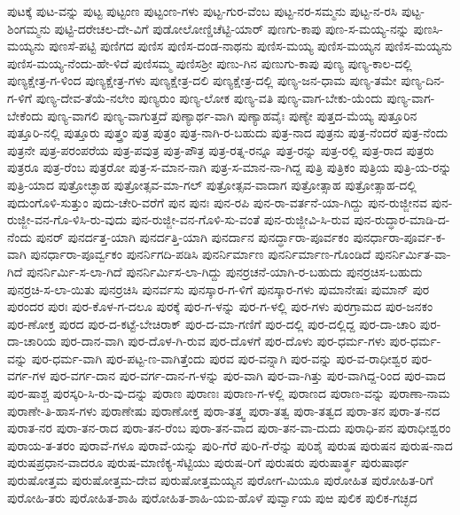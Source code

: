 ಪುಟಕ್ಕೆ
ಪುಟ-ವನ್ನು
ಪುಟ್ಟ
ಪುಟ್ಟಂಣ
ಪುಟ್ಟಂಣ-ಗಳು
ಪುಟ್ಟ-ಗುರ-ವೆಂಬ
ಪುಟ್ಟ-ನರ-ಸಮ್ಮನು
ಪುಟ್ಟ-ನ-ರಸಿ
ಪುಟ್ಟ-ಶಿಂಗಮ್ಮನು
ಪುಟ್ಟಿ-ದರೇಚಲ-ದೇ-ವಿಗೆ
ಪುಡೋಲೋಣ್ಡಿಚೆಟ್ಟಿ-ಯಾರ್
ಪುಣಗು-ಕಾಪು
ಪುಣ-ಸ-ಮಯ್ಯ-ನನ್ನು
ಪುಣಸಿ-ಮಯ್ಯನು
ಪುಣಸೆ-ಪಟ್ಟಿ
ಪುಣಿಗದ
ಪುಣಿಸ
ಪುಣಿಸ-ದಂಡ-ನಾಥನು
ಪುಣಿಸ-ಮಯ್ಯ
ಪುಣಿಸ-ಮಯ್ಯನ
ಪುಣಿಸ-ಮಯ್ಯನು
ಪುಣಿಸ-ಮಯ್ಯ-ನೆಂದು-ಹೇ-ಳಿದೆ
ಪುಣಿಸಮ್ಮ
ಪುಣಿಸಶ್ರೀ
ಪುಣು-ಗಿನ
ಪುಣುಗು-ಕಾಪು
ಪುಣ್ಯ
ಪುಣ್ಯ-ಕಾಲ-ದಲ್ಲಿ
ಪುಣ್ಯಕ್ಷೇತ್ರ-ಗ-ಳಿಂದ
ಪುಣ್ಯಕ್ಷೇತ್ರ-ಗಳು
ಪುಣ್ಯಕ್ಷೇತ್ರ-ದಲಿ
ಪುಣ್ಯಕ್ಷೇತ್ರ-ದಲ್ಲಿ
ಪುಣ್ಯ-ಜನ-ಧಾಮ
ಪುಣ್ಯ-ತಮೇ
ಪುಣ್ಯ-ದಿನ-ಗ-ಳಿಗೆ
ಪುಣ್ಯ-ದೇವ-ತೆಯೆ-ನಲೇಂ
ಪುಣ್ಯರುಂ
ಪುಣ್ಯ-ಲೋಕ
ಪುಣ್ಯ-ವತಿ
ಪುಣ್ಯ-ವಾಗ-ಬೇಕು-ಯೆಂದು
ಪುಣ್ಯ-ವಾಗ-ಬೇಕೆಂದು
ಪುಣ್ಯ-ವಾಗಲಿ
ಪುಣ್ಯ-ವಾಗುತ್ತದೆ
ಪುಣ್ಯಾರ್ಥ-ವಾಗಿ
ಪುಣ್ಯಾಹವೈಃ
ಪುಣ್ಯೇ
ಪುತ್ತದ-ಮೆಯ್ಯ
ಪುತ್ತೂರಿನ
ಪುತ್ತೂರಿ-ನಲ್ಲಿ
ಪುತ್ತೂರು
ಪುತ್ತ್ರಂ
ಪುತ್ರ
ಪುತ್ರಂ
ಪುತ್ರ-ನಾಗಿ-ರ-ಬಹುದು
ಪುತ್ರ-ನಾದ
ಪುತ್ರನು
ಪುತ್ರ-ನೆಂದರೆ
ಪುತ್ರ-ನೆಂದು
ಪುತ್ರನೇ
ಪುತ್ರ-ಪರಂಪರೆಯ
ಪುತ್ರ-ಪವುತ್ರ
ಪುತ್ರ-ಪೌತ್ರ
ಪುತ್ರ-ರತ್ನ-ರನ್ನೂ
ಪುತ್ರ-ರನ್ನು
ಪುತ್ರ-ರಲ್ಲಿ
ಪುತ್ರ-ರಾದ
ಪುತ್ರರು
ಪುತ್ರರೂ
ಪುತ್ರ-ರೆಂಬ
ಪುತ್ರರೋ
ಪುತ್ರ-ಸ-ಮಾನ-ನಾಗಿ
ಪುತ್ರ-ಸ-ಮಾನ-ನಾ-ಗಿದ್ದ
ಪುತ್ರಿ
ಪುತ್ರಿಕಂ
ಪುತ್ರಿಯ
ಪುತ್ರಿ-ಯ-ರನ್ನು
ಪುತ್ರಿ-ಯಾದ
ಪುತ್ರೋಚ್ಛಾಹ
ಪುತ್ರೋತ್ಸವ-ಮಾ-ಗಲ್
ಪುತ್ರೋತ್ಸವ-ವಾದಾಗ
ಪುತ್ರೋತ್ಸಾಹ
ಪುತ್ರೋತ್ಸಾಹ-ದಲ್ಲಿ
ಪುದುಂಗೊಳಿ-ಸುತ್ತುಂ
ಪುದು-ಚೇರಿ-ವರೆಗೆ
ಪುನ
ಪುನಃ
ಪುನ-ರಪಿ
ಪುನ-ರಾ-ವರ್ತನೆ-ಯಾ-ಗಿದ್ದು
ಪುನ-ರುಜ್ಜೀನವ
ಪುನ-ರುಜ್ಜೀ-ವನ-ಗೊ-ಳಿಸಿ-ರು-ವುದು
ಪುನ-ರುಜ್ಜೀ-ವನ-ಗೊಳಿ-ಸು-ವಂತೆ
ಪುನ-ರುಜ್ಜೀವಿ-ಸಿ-ರುವ
ಪುನ-ರುದ್ಧಾರ-ಮಾಡಿ-ದ-ನೆಂದು
ಪುನರ್
ಪುನರ್ದತ್ತ-ಯಾಗಿ
ಪುನರ್ದತ್ತಿ-ಯಾಗಿ
ಪುನರ್ದಾನ
ಪುನರ್ದ್ಧಾರಾ-ಪೂರ್ವಕಂ
ಪುನರ್ಧಾರಾ-ಪೂರ್ವ-ಕ-ವಾಗಿ
ಪುನರ್ಧಾರಾ-ಪೂರ್ವ್ವಕಂ
ಪುನರ್ನಿಗದಿ-ಪಡಿಸಿ
ಪುನರ್ನಿರ್ಮಾಣ
ಪುನರ್ನಿರ್ಮಾಣ-ಗೊಂಡಿದೆ
ಪುನರ್ನಿರ್ಮಿತ-ವಾ-ಗಿದೆ
ಪುನರ್ನಿರ್ಮಿ-ಸ-ಲಾ-ಗಿದೆ
ಪುನರ್ನಿರ್ಮಿಸ-ಲಾ-ಗಿದ್ದು
ಪುನರ್ರಚನೆ-ಯಾಗಿ-ರ-ಬಹುದು
ಪುನರ್ರಚಿಸ-ಬಹುದು
ಪುನರ್ರಚಿ-ಸ-ಲಾ-ಯಿತು
ಪುನರ್ರಚಿಸಿ
ಪುನರ್ವಸು
ಪುನಸ್ಕಾರ-ಗ-ಳಿಗೆ
ಪುನಸ್ಕಾರ-ಗಳು
ಪುಮಾನೇಷಃ
ಪುಮಾನ್
ಪುರ
ಪುರಂದರ
ಪುರಃ
ಪುರ-ಕೊಳ-ಗ-ದಲೂ
ಪುರಕ್ಕೆ
ಪುರ-ಗ-ಳನ್ನು
ಪುರ-ಗ-ಳಲ್ಲಿ
ಪುರ-ಗಳು
ಪುರಗ್ರಾಮದ
ಪುರ-ಜನಕಂ
ಪುರ-ಣೋಕ್ತ
ಪುರದ
ಪುರ-ದ-ಕಟ್ಟೆ-ಬೇಚಿರಾಕ್
ಪುರ-ದ-ಮಾ-ಗಣಿಗೆ
ಪುರ-ದಲ್ಲಿ
ಪುರ-ದಲ್ಲಿದ್ದ
ಪುರ-ದಾ-ಚಾರಿ
ಪುರ-ದಾ-ಚಾರಿಯ
ಪುರ-ದಾನ-ವಾಗಿ
ಪುರ-ದೊಳ-ಗಿ-ರುವ
ಪುರ-ದೊಳಗೆ
ಪುರ-ದೊಳು
ಪುರ-ಧರ್ಮ-ಗಳು
ಪುರ-ಧರ್ಮ-ವನ್ನು
ಪುರ-ಧರ್ಮ-ವಾಗಿ
ಪುರ-ಪಟ್ಟ-ಣ-ವಾಗಿತ್ತೆಂದು
ಪುರವ
ಪುರ-ವನ್ನಾಗಿ
ಪುರ-ವನ್ನು
ಪುರ-ವ-ರಾಧೀಶ್ವರ
ಪುರ-ವರ್ಗ-ಗಳ
ಪುರ-ವರ್ಗ-ದಾನ
ಪುರ-ವರ್ಗ-ದಾನ-ಗ-ಳನ್ನು
ಪುರ-ವಾಗಿ
ಪುರ-ವಾ-ಗಿತ್ತು
ಪುರ-ವಾಗಿದ್ದ-ರಿಂದ
ಪುರ-ವಾದ
ಪುರ-ಷಾಶ್ಚ
ಪುರಸ್ಕರಿ-ಸಿ-ರು-ವು-ದನ್ನು
ಪುರಾಣ
ಪುರಾಣಃ
ಪುರಾಣ-ಗ-ಳಲ್ಲಿ
ಪುರಾಣದ
ಪುರಾಣ-ವನ್ನು
ಪುರಾಣಾ-ನಾಮ
ಪುರಾಣೇ-ತಿ-ಹಾಸ-ಗಳು
ಪುರಾಣೇಷು
ಪುರಾಣೋಕ್ತ
ಪುರಾ-ತತ್ತ್ವ
ಪುರಾ-ತತ್ವ
ಪುರಾ-ತತ್ವದ
ಪುರಾ-ತನ
ಪುರಾ-ತ-ನದ
ಪುರಾತ-ನರ
ಪುರಾ-ತನ-ರಾದ
ಪುರಾ-ತನ-ರೆಂಬ
ಪುರಾ-ತನ-ವಾದ
ಪುರಾ-ತನ-ವಾ-ದುದು
ಪುರಾಧಿ-ಪನ
ಪುರಾಧೀಶ್ವರಂ
ಪುರಾಯ-ತ-ತರಂ
ಪುರಾವೆ-ಗಳೂ
ಪುರಾವೆ-ಯನ್ನು
ಪುರಿ-ಗೆರೆ
ಪುರಿ-ಗೆ-ರೆನ್ನು
ಪುರಿಶೈ
ಪುರುಷ
ಪುರುಷನ
ಪುರುಷ-ನಾದ
ಪುರುಷಪ್ರಧಾನ-ವಾದರೂ
ಪುರುಷ-ಮಾಣಿಕ್ಯ-ಸೆಟ್ಟಿಯು
ಪುರುಷ-ರಿಗೆ
ಪುರುಷರು
ಪುರುಷಾರ್ತ್ಥ
ಪುರುಷಾರ್ಥ
ಪುರುಷೋತ್ತಮ
ಪುರುಷೋತ್ತಮ-ದೇವ
ಪುರುಷೋತ್ತಮಯ್ಯನ
ಪುರೋಗ-ಮಿಯೂ
ಪುರೋಹಿತ
ಪುರೋಹಿತ-ರಿಗೆ
ಪುರೋಹಿ-ತರು
ಪುರೋಹಿತ-ಶಾಹಿ
ಪುರೋಹಿತ-ಶಾಹಿ-ಯಐ-ಹೊಳೆ
ಪುರ್ವ್ವಾಯ
ಪುಱ
ಪುಲಿಕ
ಪುಲಿಕ-ಗಚ್ಛದ
